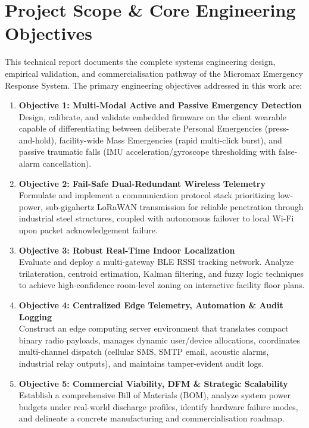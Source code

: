 \section{Project Scope \& Core Engineering Objectives}
This technical report documents the complete systems engineering design, empirical validation, and commercialisation pathway of the Micromax Emergency Response System. The primary engineering objectives addressed in this work are:

\begin{enumerate}
    \item \textbf{Objective 1: Multi-Modal Active and Passive Emergency Detection} \\
    Design, calibrate, and validate embedded firmware on the client wearable capable of differentiating between deliberate Personal Emergencies (press-and-hold), facility-wide Mass Emergencies (rapid multi-click burst), and passive traumatic falls (IMU acceleration/gyroscope thresholding with false-alarm cancellation).
    
    \item \textbf{Objective 2: Fail-Safe Dual-Redundant Wireless Telemetry} \\
    Formulate and implement a communication protocol stack prioritizing low-power, sub-gigahertz LoRaWAN transmission for reliable penetration through industrial steel structures, coupled with autonomous failover to local Wi-Fi upon packet acknowledgement failure.
    
    \item \textbf{Objective 3: Robust Real-Time Indoor Localization} \\
    Evaluate and deploy a multi-gateway BLE RSSI tracking network. Analyze trilateration, centroid estimation, Kalman filtering, and fuzzy logic techniques to achieve high-confidence room-level zoning on interactive facility floor plans.
    
    \item \textbf{Objective 4: Centralized Edge Telemetry, Automation \& Audit Logging} \\
    Construct an edge computing server environment that translates compact binary radio payloads, manages dynamic user/device allocations, coordinates multi-channel dispatch (cellular SMS, SMTP email, acoustic alarms, industrial relay outputs), and maintains tamper-evident audit logs.
    
    \item \textbf{Objective 5: Commercial Viability, DFM \& Strategic Scalability} \\
    Establish a comprehensive Bill of Materials (BOM), analyze system power budgets under real-world discharge profiles, identify hardware failure modes, and delineate a concrete manufacturing and commercialisation roadmap.
\end{enumerate}

